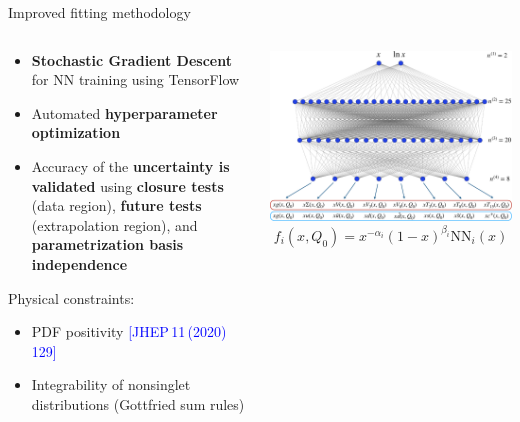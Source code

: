 \documentclass[aspectratio=169,9pt]{beamer}
\begin{document}
\begin{frame}[t]{Improved fitting methodology}
    \begin{columns}[T]
        \begin{column}{0.48\textwidth}
            \begin{itemize}
                \item \textbf{Stochastic Gradient Descent} for NN training using TensorFlow
                \item Automated \textbf{hyperparameter optimization}
                \item Accuracy of the \textbf{uncertainty is validated} using 
                {\bf closure tests} (data region), {\bf future tests} (extrapolation region), and {\bf parametrization basis independence}
            \end{itemize}
        \vspace*{1em}
        Physical constraints:
        \begin{itemize}
            \item PDF positivity {\footnotesize{{\textcolor{blue}{[JHEP\,11\,(2020)\,129]}}}}
            \item Integrability of nonsinglet distributions (Gottfried sum rules)
        \end{itemize}
        \end{column}
        \begin{column}{0.48\textwidth}
            \includegraphics[width=1.0\textwidth]{NNarch}
            \begin{equation*}
                f_{i}\left(x, Q_{0}\right)=x^{-\alpha_{i}}(1-x)^{\beta_{i}} \mathrm{NN}_{i}(x)
            \end{equation*}
        \end{column}
    \end{columns}
\end{frame}
\end{document}
